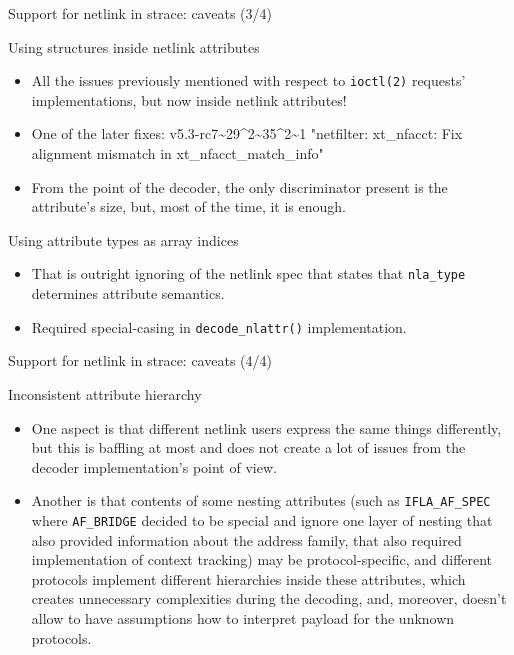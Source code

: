\documentclass[unicode,aspectratio=169]{beamer}
\begin{document}
\begin{frame}[fragile]{Support for netlink in strace: caveats \hfill (3/4)}
\begin{block}{Using structures inside netlink attributes}
\begin{itemize}
  \item All the issues previously mentioned with respect to \texttt{ioctl(2)}
        requests' implementations, but now inside netlink attributes!
  \item One of the later fixes: v5.3-rc7\~{}29\^{}2\~{}35\^{}2\~{}1 "netfilter: xt\_nfacct:
        Fix alignment mismatch in xt\_nfacct\_match\_info"
  \item From the point of the decoder, the only discriminator present
        is the attribute's size, but, most of the time, it is enough.
\end{itemize}
\end{block}
\begin{block}{Using attribute types as array indices}
\begin{itemize}
  \item That is outright ignoring of the netlink spec that states that
        \texttt{nla\_type} determines attribute semantics.
  \item Required special-casing in \texttt{decode\_nlattr()} implementation.
\end{itemize}
\end{block}
\end{frame}

\begin{frame}[fragile]{Support for netlink in strace: caveats \hfill (4/4)}
\begin{block}{Inconsistent attribute hierarchy}
\begin{itemize}
  \item One aspect is that different netlink users express the same things
        differently, but this is baffling at most and does not create
	a lot of issues from the decoder implementation's point of view.
  \item Another is that contents of some nesting attributes (such as
        \texttt{IFLA\_AF\_SPEC} where \texttt{AF\_BRIDGE} decided to be special
	and ignore one layer of nesting that also provided information about
	the address family, that also required implementation of context tracking)
        may be protocol-specific, and different protocols implement different
	hierarchies inside these attributes, which creates unnecessary
	complexities during the decoding, and, moreover, doesn't allow to have
	assumptions how to interpret payload for the unknown protocols.
\end{itemize}
\end{block}
\end{frame}
\end{document}
